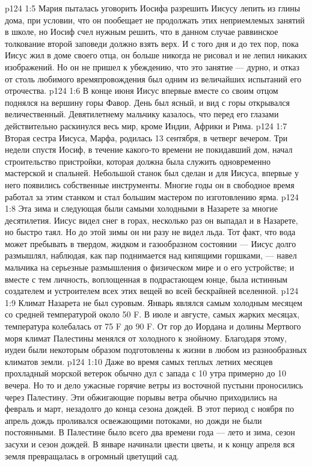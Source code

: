 \vs p124 1:5 Мария пыталась уговорить Иосифа разрешить Иисусу лепить из глины дома, при условии, что он пообещает не продолжать этих неприемлемых занятий в школе, но Иосиф счел нужным решить, что в данном случае раввинское толкование второй заповеди должно взять верх. И с того дня и до тех пор, пока Иисус жил в доме своего отца, он больше никогда не рисовал и не лепил никаких изображений. Но он не пришел к убеждению, что это занятие --- дурно, и отказ от столь любимого времяпровождения был одним из величайших испытаний его отрочества.
\vs p124 1:6 \pc В конце июня Иисус впервые вместе со своим отцом поднялся на вершину горы Фавор. День был ясный, и вид с горы открывался величественный. Девятилетнему мальчику казалось, что перед его глазами действительно раскинулся весь мир, кроме Индии, Африки и Рима.
\vs p124 1:7 \pc Вторая сестра Иисуса, Марфа, родилась 13 сентября, в четверг вечером. Три недели спустя Иосиф, в течение какого\hyp{}то времени не покидавший дом, начал строительство пристройки, которая должна была служить одновременно мастерской и спальней. Небольшой станок был сделан и для Иисуса, впервые у него появились собственные инструменты. Многие годы он в свободное время работал за этим станком и стал большим мастером по изготовлению ярма.
\vs p124 1:8 \pc Эта зима и следующая были самыми холодными в Назарете за многие десятилетия. Иисус видел снег в горах, несколько раз он выпадал и в Назарете, но быстро таял. Но до этой зимы он ни разу не видел льда. Тот факт, что вода может пребывать в твердом, жидком и газообразном состоянии --- Иисус долго размышлял, наблюдая, как пар поднимается над кипящими горшками, --- навел мальчика на серьезные размышления о физическом мире и о его устройстве; и вместе с тем личность, воплощенная в подрастающем юнце, была истинным создателем и устроителем всех этих вещей во всей бескрайней вселенной.
\vs p124 1:9 Климат Назарета не был суровым. Январь являлся самым холодным месяцем со средней температурой около 50 F. В июле и августе, самых жарких месяцах, температура колебалась от 75 F до 90 F. От гор до Иордана и долины Мертвого моря климат Палестины менялся от холодного к знойному. Благодаря этому, иудеи были некоторым образом подготовлены к жизни в любом из разнообразных климатов земли.
\vs p124 1:10 Даже во время самых теплых летних месяцев прохладный морской ветерок обычно дул с запада с 10 утра примерно до 10 вечера. Но то и дело ужасные горячие ветры из восточной пустыни проносились через Палестину. Эти обжигающие порывы ветра обычно приходились на февраль и март, незадолго до конца сезона дождей. В этот период с ноября по апрель дождь проливался освежающими потоками, но дожди не были постоянными. В Палестине было всего два времени года --- лето и зима, сезон засухи и сезон дождей. В январе начинали цвести цветы, и к концу апреля вся земля превращалась в огромный цветущий сад.

